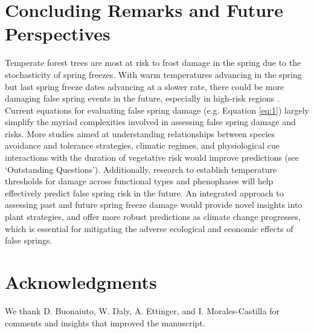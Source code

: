 \documentclass{article}\usepackage[]{graphicx}\usepackage[]{color}
\begin{document}

\section*{Concluding Remarks and Future Perspectives}
Temperate forest trees are most at risk to frost damage in the spring due to the stochasticity of spring freezes. With warm temperatures advancing in the spring but last spring freeze dates advancing at a slower rate, there could be more damaging false spring events in the future, especially in high-risk regions \citep{Gu2008, Inouye2008, Liu2018}. Current equations for evaluating false spring damage (e.g. Equation \ref{eq:1}) largely simplify the myriad complexities involved in assessing false spring damage and risks. More studies aimed at understanding relationships between species avoidance and tolerance strategies, climatic regimes, and physiological cue interactions with the duration of vegetative risk would improve predictions (see `Outstanding Questions'). Additionally, research to establish temperature thresholds for damage across functional types and phenophases will help effectively predict false spring risk in the future. An integrated approach to assessing past and future spring freeze damage would provide novel insights into plant strategies, and offer more robust predictions as climate change progresses, which is essential for mitigating the adverse ecological and economic effects of false springs.

\section*{Acknowledgments}
We thank D. Buonaiuto,  W. Daly, A. Ettinger, and I. Morales-Castilla for comments and insights that improved the manuscript. 

\nocite{Soudani2012}
\nocite{White2009}
\nocite{Schaber2005}
\nocite{Schwartz1993}
\nocite{Barker2005}
\nocite{Sanchez2013}
\nocite{Longstroth2012}
\nocite{Barlow2015}
\nocite{Longstroth2013}
\nocite{Charrier2011}

\end{document}
